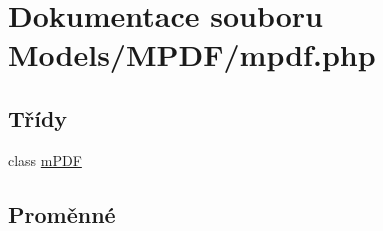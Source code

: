 \hypertarget{mpdf_8php}{\section{Dokumentace souboru Models/\-M\-P\-D\-F/mpdf.php}
\label{mpdf_8php}
}
\subsection*{Třídy}
\begin{DoxyCompactItemize}
\item 
class \hyperlink{classm_p_d_f}{m\-P\-D\-F}
\end{DoxyCompactItemize}
\subsection*{Proměnné}
